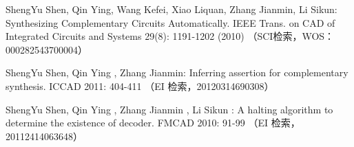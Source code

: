 \begin{resume}
\begin{enumerate}[{[}1{]}]
  \item ShengYu Shen, Qin Ying, Wang Kefei,  Xiao Liquan, Zhang Jianmin, Li Sikun: Synthesizing Complementary Circuits Automatically. IEEE Trans. on CAD of Integrated Circuits and Systems 29(8): 1191-1202 (2010) （SCI检索，WOS：000282543700004）
  \item ShengYu Shen, Qin Ying , Zhang Jianmin: Inferring assertion for complementary synthesis. ICCAD 2011: 404-411 （EI 检索，20120314690308）
  \item ShengYu Shen, Qin Ying , Zhang Jianmin , Li Sikun : A halting algorithm to determine the existence of decoder. FMCAD 2010: 91-99 （EI 检索，20112414063648）

\end{enumerate}
\end{resume}
